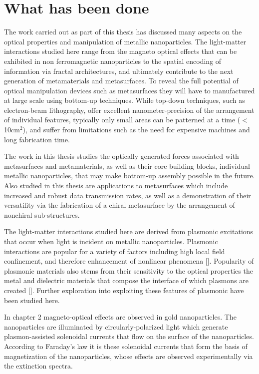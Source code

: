 \section{What has been done}
The work carried out as part of this thesis has discussed many aspects on the optical properties and manipulation of metallic nanoparticles. The light-matter interactions studied here range from the magneto optical effects that can be exhibited in non ferromagnetic nanoparticles to the spatial encoding of information via fractal architectures, and ultimately contribute to the next generation of metamaterials and metasurfaces. To reveal the full potential of optical manipulation devices such as metasurfaces they will have to manufactured at large scale using bottom-up techniques. While top-down techniques, such as electron-beam lithography, offer excellent nanometer-precision of the arrangement of individual features, typically only small areas can be patterned at a time ($<$10cm$^2$), and suffer from limitations such as the need for expensive machines and long fabrication time. 

The work in this thesis studies the optically generated forces associated with metasurfaces and metamaterials, as well as their core building blocks, individual metallic nanoparticles, that may make bottom-up assembly possible in the future. Also studied in this thesis are applications to metasurfaces which include increased and robust data transmission rates, as well as a demonstration of their versatility via the fabrication of a chiral metasurface by the arrangement of nonchiral sub-structures.

The light-matter interactions studied here are derived from plasmonic excitations that occur when light is incident on metallic nanoparticles. Plasmonic interactions are popular for a variety of factors including high local field confinement, and therefore enhancement of nonlinear phenomena [\cite{Novotny2011, Kauranen}]. Popularity of plasmonic materials also stems from their sensitivity to the optical properties the metal and dielectric materials that compose the interface of which plasmons are created [\cite{Homola}]. Further exploration into exploiting these features of plasmonic have been studied here. 

In chapter 2 magneto-optical effects are observed in gold nanoparticles. The nanoparticles are illuminated by circularly-polarized light which generate plasmon-assisted solenoidal currents that flow on the surface of the nanoparticles. According to Faraday's law it is these solenoidal currents that form the basis of magnetization of the nanoparticles, whose effects are observed experimentally via the extinction spectra.

